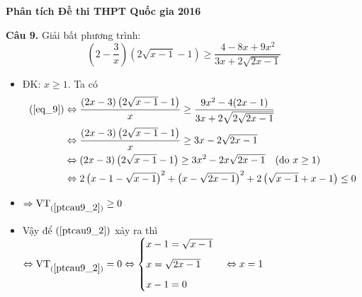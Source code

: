 \documentclass[handout]{beamer} %
\newcommand\Fontvi{\fontsize{9}{7.2}\selectfont}
\newcommand{\cau}[2]{\begin{block}{}
		{\color{red}\textbf{Câu #1.}} #2
	\end{block}
}
\begin{document}
	\begin{frame}{\textbf{\qquad Phân tích Đề thi THPT Quốc gia 2016}}
		\Fontvi
		\cau{9}{Giải bất phương trình: \begin{equation}\label{eq_9}
				\left(2-\dfrac{3}{x}\right)\left(2\sqrt{x-1}-1\right) \geq \dfrac{4-8x+9x^2}{3x+2\sqrt{2x-1}}
			\end{equation}}
			\begin{itemize}
				\item  ĐK: $x\geq 1$. Ta có
				\begin{align}
					(\ref{eq_9})&\Leftrightarrow \frac{(2x-3)\left(2\sqrt{x-1}-1\right)}{x}\geq \frac{9x^2-4(2x-1)}{3x+2\sqrt{2\sqrt{2x-1}}}\nonumber\\
					&\Leftrightarrow \frac{(2x-3)\left(2\sqrt{x-1}-1\right)}{x}\geq 3x-2\sqrt{2x-1}\nonumber\\
					&\Leftrightarrow (2x-3)\left(2\sqrt{x-1}-1\right)\geq 3x^2-2x\sqrt{2x-1} \quad(\mbox{do }x\geq 1)\nonumber\\
					&\Leftrightarrow 2\left(x-1-\sqrt{x-1}\right)^2+\left(x-\sqrt{2x-1}\right)^2+2\left(\sqrt{x-1}+x-1\right)\leq 0\label{ptcau9_2}
				\end{align}
				\item $\Rightarrow \mbox{VT}_{(\ref{ptcau9_2})}\geq 0$
				\item Vậy để $(\ref{ptcau9_2})$ xảy ra thì $\Leftrightarrow \mbox{VT}_{(\ref{ptcau9_2})}=0\Leftrightarrow
				\begin{cases}
				x-1=\sqrt{x-1}\\[6pt]
				x=\sqrt{2x-1}\\[6pt]
				x-1=0
				\end{cases}\Leftrightarrow x=1$
			\end{itemize}
		\end{frame}
		
\end{document}
